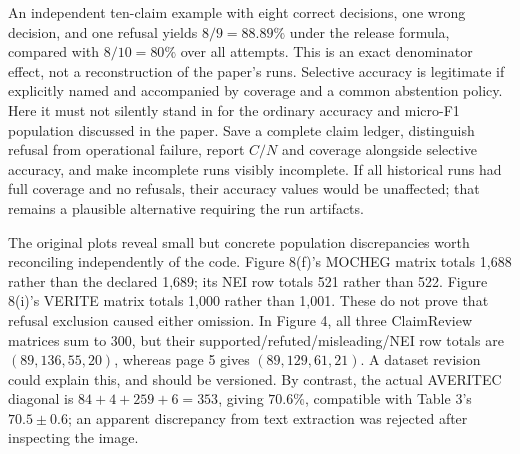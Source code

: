 \documentclass[10pt]{article}
\begin{document}
An independent ten-claim example with eight correct decisions, one wrong decision, and one refusal yields \(8/9=88.89\%\) under the release formula, compared with \(8/10=80\%\) over all attempts. This is an exact denominator effect, not a reconstruction of the paper’s runs. Selective accuracy is legitimate if explicitly named and accompanied by coverage and a common abstention policy. Here it must not silently stand in for the ordinary accuracy and micro-F1 population discussed in the paper. Save a complete claim ledger, distinguish refusal from operational failure, report \(C/N\) and coverage alongside selective accuracy, and make incomplete runs visibly incomplete. If all historical runs had full coverage and no refusals, their accuracy values would be unaffected; that remains a plausible alternative requiring the run artifacts.\par
The original plots reveal small but concrete population discrepancies worth reconciling independently of the code. Figure 8(f)’s MOCHEG matrix totals 1,688 rather than the declared 1,689; its NEI row totals 521 rather than 522. Figure 8(i)’s VERITE matrix totals 1,000 rather than 1,001. These do not prove that refusal exclusion caused either omission. In Figure 4, all three ClaimReview matrices sum to 300, but their supported/refuted/misleading/NEI row totals are \((89,136,55,20)\), whereas page 5 gives \((89,129,61,21)\). A dataset revision could explain this, and should be versioned. By contrast, the actual AVERITEC diagonal is \(84+4+259+6=353\), giving \(70.6\%\), compatible with Table 3’s \(70.5\pm0.6\); an apparent discrepancy from text extraction was rejected after inspecting the image.\par
\end{document}
